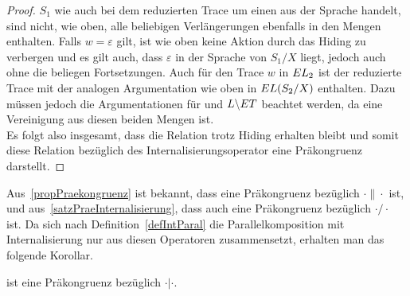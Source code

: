 \begin{proof}
  $S_1$ wie auch bei dem reduzierten Trace um einen aus der Sprache handelt,
  sind nicht, wie oben, alle beliebigen Verlängerungen ebenfalls in den Mengen
  enthalten. Falls $w=\varepsilon$ gilt, ist wie oben keine Aktion durch das
  Hiding zu verbergen und es gilt auch, dass $\varepsilon$ in der Sprache von
  $S_1/X$ liegt, jedoch auch ohne die beliegen Fortsetzungen. Auch für den
  Trace $w$ in $EL{}_2$ ist der reduzierte Trace mit
  der analogen Argumentation wie oben in $EL{}(S_2/X)$ enthalten. Dazu müssen
  jedoch die Argumentationen für \ET{} und $L\backslash ET{}$ beachtet werden,
  da \EL{} eine Vereinigung aus diesen beiden Mengen ist.\\
  Es folgt also insgesamt, dass die Relation \ERel{} trotz Hiding erhalten
  bleibt und somit diese Relation bezüglich des Internalisierungsoperator eine
  Präkongruenz darstellt.
\end{proof}

Aus~\ref{propPraekongruenz} ist bekannt, dass \ERel{} eine Präkongruenz
bezüglich $\cdot\|\cdot$ ist, und aus~\ref{satzPraeInternalisierung}, dass
\ERel{} auch eine Präkongruenz bezüglich $\cdot/\cdot$ ist. Da sich nach
Definition~\ref{defIntParal} die Parallelkomposition mit Internalisierung nur
aus diesen Operatoren zusammensetzt, erhalten man das folgende Korollar.

\begin{kor}
  \ERel{} ist eine Präkongruenz bezüglich $\cdot|\cdot$.
\end{kor}
